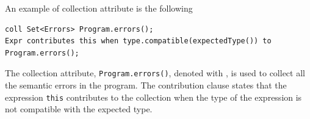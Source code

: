 \begin{itemize}
    An example of collection attribute is the following
    \begin{lstlisting}[language=JastAdd]
coll Set<Errors> Program.errors();
Expr contributes this when type.compatible(expectedType()) to Program.errors();
    \end{lstlisting}
    The collection attribute, \texttt{Program.errors()}, denoted with ,
    is used to collect all the semantic errors in the program. The contribution clause
    states that the expression \texttt{this} contributes to the collection
     when the type of the expression is not compatible with
    the expected type.
\end{itemize}




